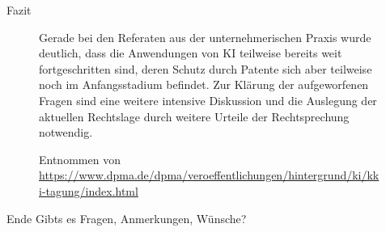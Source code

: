\documentclass{beamer}
\begin{document}
    \begin{frame}{Fazit}
      \begin{figure}
        \begin{tcolorbox}[colback=green!5,colframe=green!40!black,title=Viele Fragen weiter offen]
            Gerade bei den Referaten aus der unternehmerischen Praxis wurde deutlich, dass die Anwendungen von KI teilweise bereits weit fortgeschritten sind, deren Schutz durch Patente sich aber teilweise noch im Anfangsstadium befindet. Zur Klärung der aufgeworfenen Fragen sind eine weitere intensive Diskussion und die Auslegung der aktuellen Rechtslage durch weitere Urteile der Rechtsprechung notwendig.

            \caption{Entnommen von \url{https://www.dpma.de/dpma/veroeffentlichungen/hintergrund/ki/kki-tagung/index.html}}
        \end{tcolorbox}
      \end{figure}
    \end{frame}

    \begin{frame}{Ende}
        Gibts es Fragen, Anmerkungen, Wünsche?
    \end{frame}

    {}
    
\end{document}
